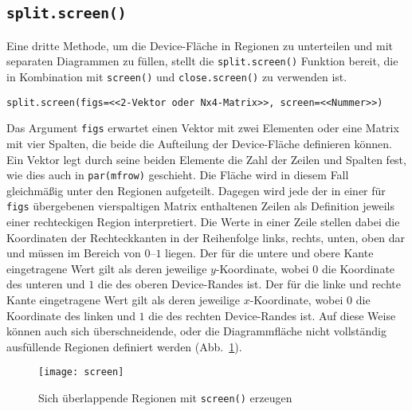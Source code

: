 \subsection{\texttt{split.screen()}}

Eine dritte Methode, um die Device-Fläche in Regionen zu unterteilen und mit separaten Diagrammen zu füllen, stellt die \lstinline!split.screen()! Funktion bereit, die in Kombination mit \lstinline!screen()! und \lstinline!close.screen()! zu verwenden ist.
\begin{lstlisting}
split.screen(figs=<<2-Vektor oder Nx4-Matrix>>, screen=<<Nummer>>)
\end{lstlisting}

Das Argument \lstinline!figs! erwartet einen Vektor mit zwei Elementen oder eine Matrix mit vier Spalten, die beide die Aufteilung der Device-Fläche definieren können. Ein Vektor legt durch seine beiden Elemente die Zahl der Zeilen und Spalten fest, wie dies auch in \lstinline!par(mfrow)! geschieht. Die Fläche wird in diesem Fall gleichmäßig unter den Regionen aufgeteilt. Dagegen wird jede der in einer für \lstinline!figs! übergebenen vierspaltigen Matrix enthaltenen Zeilen als Definition jeweils einer rechteckigen Region interpretiert. Die Werte in einer Zeile stellen dabei die Koordinaten der Rechteckkanten in der Reihenfolge links, rechts, unten, oben dar und müssen im Bereich von $0$--$1$ liegen. Der für die untere und obere Kante eingetragene Wert gilt als deren jeweilige $y$-Koordinate, wobei $0$ die Koordinate des unteren und $1$ die des oberen Device-Randes ist. Der für die linke und rechte Kante eingetragene Wert gilt als deren jeweilige $x$-Koordinate, wobei $0$ die Koordinate des linken und $1$ die des rechten Device-Randes ist. Auf diese Weise können auch sich überschneidende, oder die Diagrammfläche nicht vollständig ausfüllende Regionen definiert werden (Abb.\ \ref{fig:screen}).

\begin{figure}[ht]
\centering
\texttt{[image: screen]}
\vspace*{-1em}
\caption{Sich überlappende Regionen mit \lstinline!screen()! erzeugen}
\label{fig:screen}
\end{figure}

